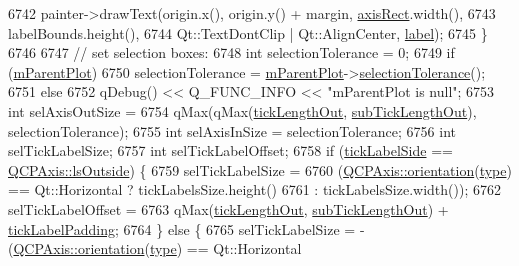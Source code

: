 \begin{DoxyCode}
6742       painter->drawText(origin.x(), origin.y() + margin, \hyperlink{class_q_c_p_axis_painter_private_afcd55b0e1ecd689fffd2b1fc75dc7732}{axisRect}.width(),
6743                         labelBounds.height(),
6744                         Qt::TextDontClip | Qt::AlignCenter, \hyperlink{class_q_c_p_axis_painter_private_afe004c322f92543c0467afc02da6cf6d}{label});
6745   \}
6746 
6747   \textcolor{comment}{// set selection boxes:}
6748   \textcolor{keywordtype}{int} selectionTolerance = 0;
6749   \textcolor{keywordflow}{if} (\hyperlink{class_q_c_p_axis_painter_private_a882029a5f2d4abd71289d415c9b90a28}{mParentPlot})
6750     selectionTolerance = \hyperlink{class_q_c_p_axis_painter_private_a882029a5f2d4abd71289d415c9b90a28}{mParentPlot}->\hyperlink{class_q_custom_plot_a7b738074c75e80070ef6a10263c6cd69}{selectionTolerance}();
6751   \textcolor{keywordflow}{else}
6752     qDebug() << Q\_FUNC\_INFO << \textcolor{stringliteral}{"mParentPlot is null"};
6753   \textcolor{keywordtype}{int} selAxisOutSize =
6754       qMax(qMax(\hyperlink{class_q_c_p_axis_painter_private_acbebb1f868906200f968627bc907b77d}{tickLengthOut}, \hyperlink{class_q_c_p_axis_painter_private_a5f1afddc3dc7ccc4d5adcbcd8f0c2218}{subTickLengthOut}), selectionTolerance);
6755   \textcolor{keywordtype}{int} selAxisInSize = selectionTolerance;
6756   \textcolor{keywordtype}{int} selTickLabelSize;
6757   \textcolor{keywordtype}{int} selTickLabelOffset;
6758   \textcolor{keywordflow}{if} (\hyperlink{class_q_c_p_axis_painter_private_a9d27f7625fcfbeb3a60193d0c18fc7e9}{tickLabelSide} == \hyperlink{class_q_c_p_axis_a24b13374b9b8f75f47eed2ea78c37db9a2eadb509fc0c9a8b35b85c86ec9f3c7a}{QCPAxis::lsOutside}) \{
6759     selTickLabelSize =
6760         (\hyperlink{class_q_c_p_axis_a57483f2f60145ddc9e63f3af53959265}{QCPAxis::orientation}(\hyperlink{class_q_c_p_axis_painter_private_ae04594e97417336933d807c86d353098}{type}) == Qt::Horizontal ? tickLabelsSize.height()
6761                                                       : tickLabelsSize.width());
6762     selTickLabelOffset =
6763         qMax(\hyperlink{class_q_c_p_axis_painter_private_acbebb1f868906200f968627bc907b77d}{tickLengthOut}, \hyperlink{class_q_c_p_axis_painter_private_a5f1afddc3dc7ccc4d5adcbcd8f0c2218}{subTickLengthOut}) + 
      \hyperlink{class_q_c_p_axis_painter_private_a264cfa080e84e536cf2d1ab9c5d5cc5f}{tickLabelPadding};
6764   \} \textcolor{keywordflow}{else} \{
6765     selTickLabelSize = -(\hyperlink{class_q_c_p_axis_a57483f2f60145ddc9e63f3af53959265}{QCPAxis::orientation}(\hyperlink{class_q_c_p_axis_painter_private_ae04594e97417336933d807c86d353098}{type}) == Qt::Horizontal

\end{DoxyCode}
